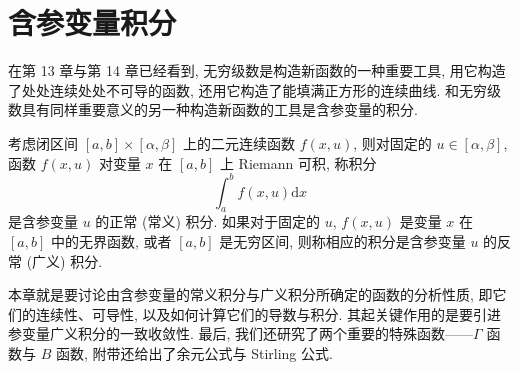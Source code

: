
\chapter{含参变量积分}\label{ch:15}

在第 13 章与第 14 章已经看到, 无穷级数是构造新函数的一种重要工具, 用它构造了处处连续处处不可导的函数, 还用它构造了能填满正方形的连续曲线. 和无穷级数具有同样重要意义的另一种构造新函数的工具是含参变量的积分.

考虑闭区间 $[a,b]\times[\alpha,\beta]$ 上的二元连续函数 $f(x,u)$, 则对固定的 $u\in[\alpha,\beta]$, 函数 $f(x,u)$ 对变量 $x$ 在 $[a,b]$ 上 Riemann 可积, 称积分
\[
  \int_{a}^{b}f(x,u)\mathrm{d}x
\]
是含参变量 $u$ 的正常 (常义) 积分. 如果对于固定的 $u$, $f(x,u)$ 是变量 $x$ 在 $[a,b]$ 中的无界函数, 或者 $[a,b]$ 是无穷区间, 则称相应的积分是含参变量 $u$ 的反常 (广义) 积分.

本章就是要讨论由含参变量的常义积分与广义积分所确定的函数的分析性质, 即它们的连续性、可导性, 以及如何计算它们的导数与积分. 其起关键作用的是要引进参变量广义积分的一致收敛性. 最后, 我们还研究了两个重要的特殊函数——$\Gamma$ 函数与 $B$ 函数, 附带还给出了余元公式与 Stirling 公式.






